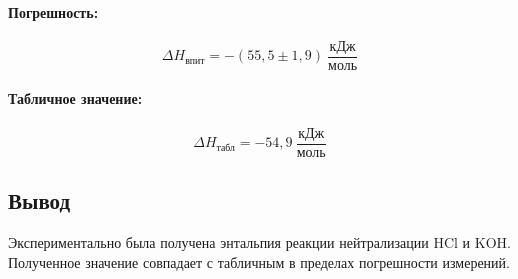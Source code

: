 \documentclass[a4paper, 12pt]{article}
\begin{document}
\paragraph{Погрешность:}
\[
    \Delta H_{\text{впит}} = -(55{,}5 \pm 1{,}9) \ \frac{\text{кДж}}{\text{моль}}
\]

\paragraph{Табличное значение:}
\[
    \Delta H_{\text{табл}} = -54{,}9 \ \frac{\text{кДж}}{\text{моль}}
\]

\subsection*{Вывод}
Экспериментально была получена энтальпия реакции нейтрализации HCl и KOH. Полученное значение совпадает с табличным в пределах погрешности измерений.
\end{document}
